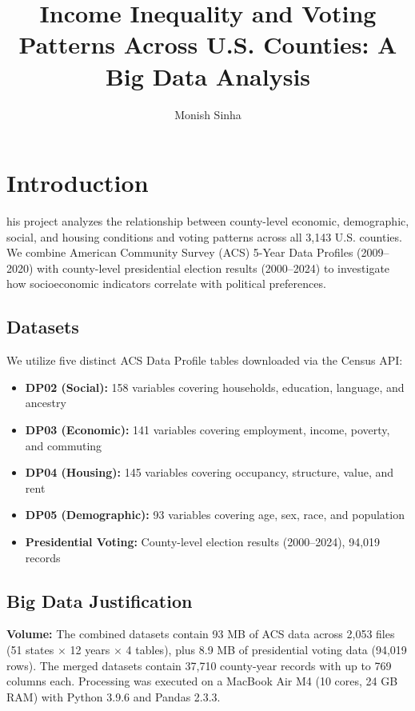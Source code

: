 \documentclass[9pt,a4paper,onecolumn,twoside]{tau-class/tau}
\title{Income Inequality and Voting Patterns Across U.S. Counties: A Big Data Analysis}
\author[a,1]{Monish Sinha}
\affil[a]{Big Data, University College Dublin}
\begin{document}
\maketitle 
\thispagestyle{firststyle} 
\tauabstract 


\section{Introduction}

his project analyzes the relationship between county-level economic, demographic, social, and housing conditions and voting patterns across all 3,143 U.S. counties. We combine American Community Survey (ACS) 5-Year Data Profiles (2009--2020) with county-level presidential election results (2000--2024) to investigate how socioeconomic indicators correlate with political preferences.

\subsection{Datasets}

We utilize five distinct ACS Data Profile tables downloaded via the Census API:

\begin{itemize}
    \item \textbf{DP02 (Social):} 158 variables covering households, education, language, and ancestry
    \item \textbf{DP03 (Economic):} 141 variables covering employment, income, poverty, and commuting
    \item \textbf{DP04 (Housing):} 145 variables covering occupancy, structure, value, and rent
    \item \textbf{DP05 (Demographic):} 93 variables covering age, sex, race, and population
    \item \textbf{Presidential Voting:} County-level election results (2000--2024), 94,019 records
\end{itemize}

\subsection{Big Data Justification}

\textbf{Volume:} The combined datasets contain 93 MB of ACS data across 2,053 files (51 states $\times$ 12 years $\times$ 4 tables), plus 8.9 MB of presidential voting data (94,019 rows). The merged datasets contain 37,710 county-year records with up to 769 columns each. Processing was executed on a MacBook Air M4 (10 cores, 24 GB RAM) with Python 3.9.6 and Pandas 2.3.3.
\end{document}
